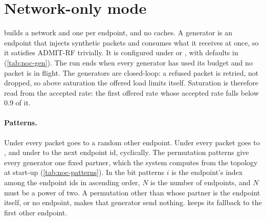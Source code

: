 \section{Network-only mode}\label{sec:noc-generators}

 builds a network and one  per endpoint, and no
caches. A generator is an endpoint that injects synthetic packets and consumes what it receives at
once, so it satisfies ADMIT-RF trivially. It is configured under  or
, with defaults in 
(\cref{tab:noc-gen}). The run ends when every generator has used its budget and no packet is in
flight. The generators are closed-loop: a refused packet is retried, not dropped, so above
saturation the offered load limits itself. Saturation is therefore read from the accepted rate:
the first offered rate whose accepted rate falls below 0.9 of it.

\paragraph{Patterns.} Under  every packet goes to a random other endpoint. Under
 every packet goes to , and under  to the next
endpoint id, cyclically. The permutation patterns give every generator one fixed partner, which
the system computes from the topology at start-up (\cref{tab:noc-patterns}). In the bit patterns
$i$ is the endpoint's index among the endpoint ids in ascending order, $N$ is the number of
endpoints, and $N$ must be a power of two. A permutation other than  whose partner
is the endpoint itself, or no endpoint, makes that generator send nothing.  keeps
its fallback to the first other endpoint.

